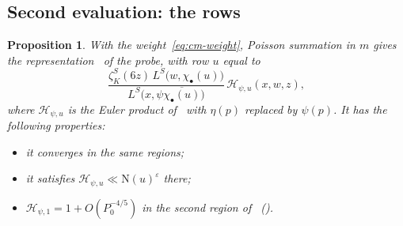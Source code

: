 \documentclass[11pt]{article}
\numberwithin{equation}{section}
\newcommand{\N}{\mathrm N}
\newtheorem{proposition}{Proposition}
\begin{document}
\subsection{Second evaluation: the rows}
\begin{proposition}\label{prop:cm-rows}
With the weight~\eqref{eq:cm-weight}, Poisson summation in $m$ gives the
representation~\cite[eq.~(7.5)]{OAI78} of the probe, with row $u$
equal to
\begin{equation}\label{eq:d075}
 \frac{\zeta_K^S(6z)\,L^S\bigl(w,\chi_\bullet(u)\bigr)}
      {L^S\bigl(x,\psi\overline{\chi_\bullet(u)}\bigr)}\,\mathcal H_{\psi,u}(x,w,z),
\end{equation}
where $\mathcal H_{\psi,u}$ is the Euler product of~\cite[Lemma~7.1]{OAI78}
with $\eta(p)$ replaced by $\psi(p)$. It has the following properties:
\begin{itemize}
\item it converges in the same regions;
\item it satisfies $\mathcal H_{\psi,u}\ll\N(u)^\varepsilon$ there;
\item $\mathcal H_{\psi,1}=1+O(P_0^{-4/5})$ in the second region of~\cite{OAI78} (\cite[Lemma~7.1]{OAI78}).
\end{itemize}
\end{proposition}
\end{document}
